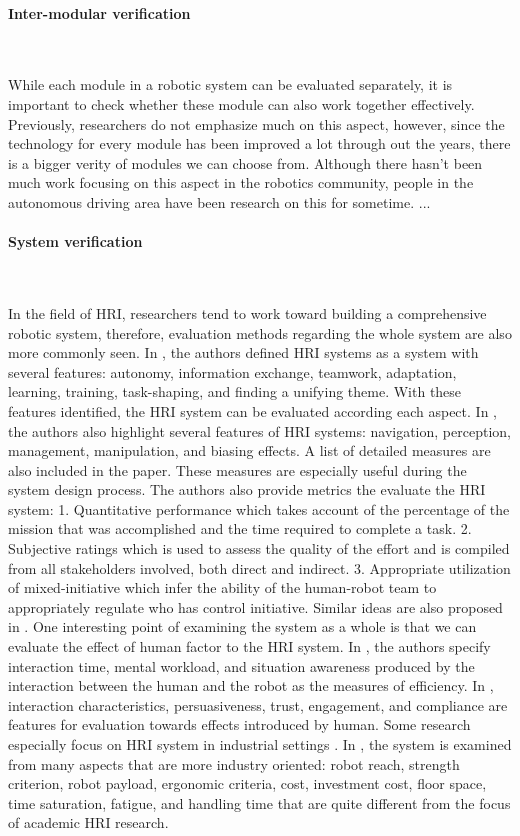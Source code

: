 \paragraph{Inter-modular verification}~

While each module in a robotic system can be evaluated separately, it is important to check whether these module can also work together effectively. Previously, researchers do not emphasize much on this aspect, however, since the technology for every module has been improved a lot through out the years, there is a bigger verity of modules we can choose from. Although there hasn't been much work focusing on this aspect in the robotics community, people in the autonomous driving area have been research on this for sometime. ...    

\paragraph{System verification}~

In the field of HRI, researchers tend to work toward building a comprehensive robotic system, therefore, evaluation methods regarding the whole system are also more commonly seen. In \cite{goodrich2008human}, the authors defined HRI systems as a system with several features: autonomy, information exchange, teamwork, adaptation, learning, training, task-shaping, and finding a unifying theme. With these features identified, the HRI system can be evaluated according each aspect. In \cite{steinfeld2006common}, the authors also highlight several features of HRI systems: navigation, perception, management, manipulation, and biasing effects. A list of detailed measures are also included in the paper. These measures are especially useful during the system design process. The authors also provide metrics the evaluate the HRI system: 1. Quantitative performance which takes account of the percentage of the mission that was accomplished and the time required to complete a task. 2. Subjective ratings which is used to assess the quality of the effort and is compiled from all stakeholders involved, both direct and indirect. 3. Appropriate utilization of mixed-initiative which infer the ability of the human-robot team to appropriately regulate who has control initiative. Similar ideas are also proposed in \cite{burke2004final,murphy2013survey}. One interesting point of examining the system as a whole is that we can evaluate the effect of human factor to the HRI system. In \cite{goodrich2008human}, the authors specify interaction time, mental workload, and situation awareness produced by the interaction between the human and the robot as the measures of efficiency. In \cite{steinfeld2006common}, interaction characteristics, persuasiveness, trust, engagement, and compliance are features for evaluation towards effects introduced by human. Some research especially focus on HRI system in industrial settings \cite{michalos2018method,takata2011human,chen2011assembly}. In \cite{michalos2018method}, the system is examined from many aspects that are more industry oriented: robot reach, strength criterion, robot payload, ergonomic criteria, cost, investment cost, floor space, time saturation, fatigue, and handling time that are quite different from the focus of academic HRI research.

